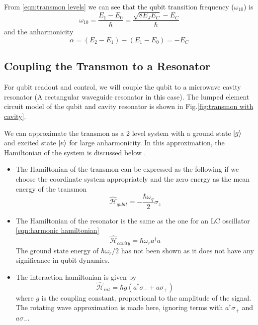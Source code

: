 From \ref{eqn:transmon levels} we can see that the qubit transition frequency ($\omega_{10}$) is
\begin{equation}
\omega_{10}=\frac{E_1-E_0}{\hbar}=\frac{\sqrt{8E_JE_C}-E_C}{\hbar}
\end{equation}
and the anharmonicity
\begin{equation}
\alpha=(E_2-E_1)-(E_1-E_0)=-E_C
\end{equation}

\subsection{Coupling the Transmon to a Resonator}

For qubit readout and control, we will couple the qubit to a microwave cavity resonator (A rectangular waveguide resonator in this case). The lumped element circuit model of the qubit and cavity resonator is shown in Fig.\ref{fig:transmon with cavity}.

We can approximate the transmon as a 2 level system with a ground state $\ket{g}$ and excited state $\ket{e}$ for large anharmonicity. In this approximation, the Hamiltonian of the system is discussed below  \cite{Richer2013,Schuster2007}.
\begin{itemize}
\item The Hamiltonian of the transmon can be expressed as the following if we choose the coordinate system appropriately and the zero energy as the mean energy of the transmon
\begin{equation}
\hat{\mathcal{H}}_{qubit}=-\frac{\hbar\omega_q}{2}\sigma_z
\label{eqn:qubit free hamiltonian}
\end{equation}
\item The Hamiltonian of the resonator is the same as the one for  an LC oscillator \ref{eqn:harmonic hamiltonian}
\begin{equation}
\hat{\mathcal{H}}_{cavity}=\hbar\omega_ra^\dag a
\end{equation}
The ground state energy of $\hbar\omega_r/2$ has not been shown as it does not have any significance in qubit dynamics.
\item The interaction hamiltonian is given by 
\begin{equation}
\hat{\mathcal{H}}_{int}=\hbar g(a^\dag\sigma_-+a\sigma_+)
\end{equation}
where $g$ is the coupling constant, proportional to the amplitude of the signal. The rotating wave approximation is made here, ignoring terms with $a^\dag\sigma_+$ and $a\sigma_-$.
\end{itemize}

